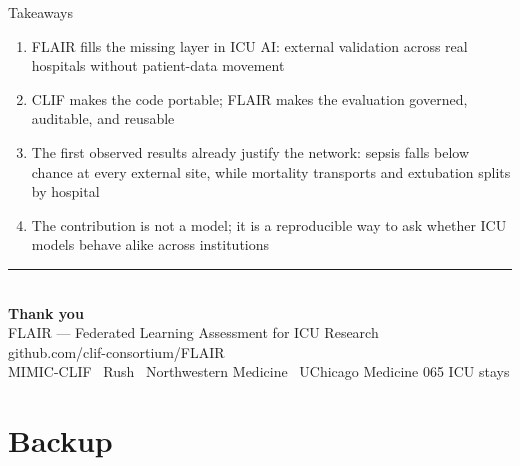 \documentclass[aspectratio=169,11pt,xcolor={table}]{beamer}
\begin{document}
\begin{frame}{Takeaways}
  \begin{enumerate}
    \item FLAIR fills the missing layer in ICU AI: external validation across real hospitals without patient-data movement
    \item CLIF makes the code portable; FLAIR makes the evaluation governed, auditable, and reusable
    \item The first observed results already justify the network: sepsis falls below chance at every external site, while mortality transports and extubation splits by hospital
    \item The contribution is not a model; it is a reproducible way to ask whether ICU models behave alike across institutions
  \end{enumerate}
\end{frame}

\begin{frame}[plain]
  \vfill
  \centering
  {\color{flairblue}\rule{0.14\paperwidth}{3pt}}\\[0.9em]
  {\Huge\color{flairink}\textbf{Thank you}}\\[0.8em]
  {\large\color{flairmuted} FLAIR --- Federated Learning Assessment for ICU Research}\\[0.4em]
  {\small\color{flairmuted} github.com/clif-consortium/FLAIR}\\[1.2em]
  {\footnotesize\color{flairmuted} MIMIC-CLIF \textperiodcentered\ Rush \textperiodcentered\ Northwestern Medicine \textperiodcentered\ UChicago Medicine \quad\textbullet{}065 ICU stays}
  \vfill
\end{frame}

\appendix
\section{Backup}
\end{document}
